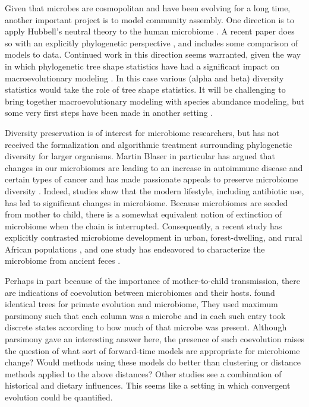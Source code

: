 \documentclass{amsart}
\begin{document}
Given that microbes are cosmopolitan and have been evolving for a long time, another important project is to model community assembly.
One direction is to apply Hubbell's neutral theory to the human microbiome \citep{fierer2012animalcules,costello2012application}.
A recent paper does so with an explicitly phylogenetic perspective \citep{o2012phylogenetic}, and includes some comparison of models to data.
Continued work in this direction seems warranted, given the way in which phylogenetic tree shape statistics have had a significant impact on macroevolutionary modeling \citep{mooers1997inferring,aldous2011five}.
In this case various (alpha and beta) diversity statistics would take the role of tree shape statistics.
It will be challenging to bring together macroevolutionary modeling with species abundance modeling, but some very first steps have been made in another setting \citep{lambert2013predicting}.

Diversity preservation is of interest for microbiome researchers, but has not received the formalization and algorithmic treatment surrounding phylogenetic diversity for larger organisms.
Martin Blaser in particular has argued that changes in our microbiomes are leading to an increase in autoimmune disease and certain types of cancer and has made passionate appeals to preserve microbiome diversity \citep{blaser2011antibiotic,cho2012human}.
Indeed, studies show that the modern lifestyle, including antibiotic use, has led to significant changes in microbiome.
Because microbiomes are seeded from mother to child, there is a somewhat equivalent notion of extinction of microbiome when the chain is interrupted.
Consequently, a recent study has explicitly contrasted microbiome development in urban, forest-dwelling, and rural African populations \citep{yatsunenko2012human}, and one study has endeavored to characterize the microbiome from ancient feces \citep{tito2012insights}.

Perhaps in part because of the importance of mother-to-child transmission, there are indications of coevolution between microbiomes and their hosts.
\citet{ochman2010evolutionary} found identical trees for primate evolution and microbiome,
They used maximum parsimony such that each column was a microbe and in each such entry took discrete states according to how much of that microbe was present.
Although parsimony gave an interesting answer here, the presence of such coevolution raises the question of what sort of forward-time models are appropriate for microbiome change?
Would methods using these models do better than clustering or distance methods applied to the above distances?
Other studies \citep[e.g.][]{phillips2012microbiome,delsuc2013convergence} see a combination of historical and dietary influences.
This seems like a setting in which convergent evolution could be quantified.
\end{document}
